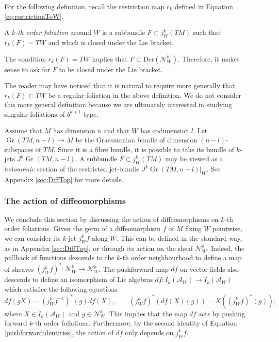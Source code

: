 \documentclass[10pt]{amsart}
\newcommand{\Gr}{\operatorname{Gr}}
\numberwithin{theoremalpha}{section}
\numberwithin{equation}{section}
\numberwithin{definition}{section}
\numberwithin{theorem}{section}
\numberwithin{proposition}{section}
\numberwithin{lemma}{section}
\numberwithin{example}{section}
\numberwithin{remark}{section}
\numberwithin{corollary}{section}
\numberwithin{question}{section}
\numberwithin{problem}{section}
\numberwithin{assumption}{section}
\theoremstyle{named}
\numberwithin{equation}{section}
\begin{document}
For the following definition, recall the restriction map $r_k$ defined in Equation \ref{eq:restrictionToW}. 
\begin{definition}
A \emph{$k$-th order foliation} around $W$ is a subbundle $F \subset j_{W}^{k}(TM)$ such that $r_{k}(F) = TW$ and which is closed under the Lie bracket. 
\end{definition}
\begin{remark}
The condition $r_{k}(F) = TW$ implies that $F \subset  \mathrm{Der}(\mathcal{N}_{W}^{k})$. Therefore, it makes sense to ask for $F$ to be closed under the Lie bracket. 
\end{remark}
\begin{remark}
The reader may have noticed that it is natural to require more generally that $r_{k}(F) \subset TW$ be a regular foliation in the above definition. We do not consider this more general definition because we are ultimately interested in studying singular foliations of $b^{k+1}$-type. 
\end{remark}

\begin{remark}\label{rem:grass}
Assume that $M$ has dimension $n$ and that $W$ has codimension $l$. Let $\Gr(TM, n - l) \to M$ be the Grassmanian bundle of dimension $(n-l)$-subspaces of $TM$. Since it is a fibre bundle, it is possible to take its bundle of $k$-jets $J^k\Gr(TM,n-l)$. A subbundle $F \subset j^k_W(TM)$ may be viewed as a \emph{holonomic} section of the restricted jet-bundle $J^k\Gr(TM,n-l)|_W$. See Appendix \ref{sec:DiffTop} for more details.
\end{remark}

\subsubsection{The action of diffeomorphisms}

We conclude this section by discussing the action of diffeomorphisms on $k$-th order foliations. Given the germ of a diffeomorphism $f$ of $M$ fixing $W$ pointwise, we can consider its $k$-jet $j^k_Wf$ along $W$. This can be defined in the standard way, as in Appendix \ref{sec:DiffTop}, or through its action on the sheaf $\mathcal{N}_{W}^{k}$. Indeed, the pullback of functions descends to the $k$-th order neighbourhood to define a map of sheaves $(j^k_Wf)^* : \mathcal{N}_{W}^{k} \to \mathcal{N}_{W}^{k}$. The pushforward map $df$ on vector fields also descends to define an isomorphism of Lie algebras $df: I_{k}(\mathcal{A}_{W}) \to I_{k}(\mathcal{A}_{W})$ which satisfies the following equations 
\begin{equation} \label{pushforwardidentities}
df( g X) = (j^k_Wf^{-1})^*(g) df(X), \qquad (j^k_Wf)^*( df(X)(g) ) = X( (j^k_Wf)^*(g)), 
\end{equation}
where $X \in  I_{k}(\mathcal{A}_{W})$ and $g \in \mathcal{N}_{W}^k$. This implies that the map $df$ acts by pushing forward $k$-th order foliations. Furthermore, by the second identity of Equation \ref{pushforwardidentities}, the action of $df$ only depends on $j^k_Wf$. 
\end{document}
